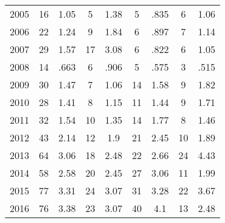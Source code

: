 \begin{table}[htbp]
\begin{tabular}{l*{8}{c}}
2005      &       16&     1.05&        5&     1.38&        5&     .835&        6&     1.06\\
2006      &       22&     1.24&        9&     1.84&        6&     .897&        7&     1.14\\
2007      &       29&     1.57&       17&     3.08&        6&     .822&        6&     1.05\\
2008      &       14&     .663&        6&     .906&        5&     .575&        3&     .515\\
2009      &       30&     1.47&        7&     1.06&       14&     1.58&        9&     1.82\\
2010      &       28&     1.41&        8&     1.15&       11&     1.44&        9&     1.71\\
2011      &       32&     1.54&       10&     1.35&       14&     1.77&        8&     1.46\\
2012      &       43&     2.14&       12&      1.9&       21&     2.45&       10&     1.89\\
2013      &       64&     3.06&       18&     2.48&       22&     2.66&       24&     4.43\\
2014      &       58&     2.58&       20&     2.45&       27&     3.06&       11&     1.99\\
2015      &       77&     3.31&       24&     3.07&       31&     3.28&       22&     3.67\\
2016      &       76&     3.38&       23&     3.07&       40&      4.1&       13&     2.48\\
\hline\hline
\end{tabular}
\end{table}
